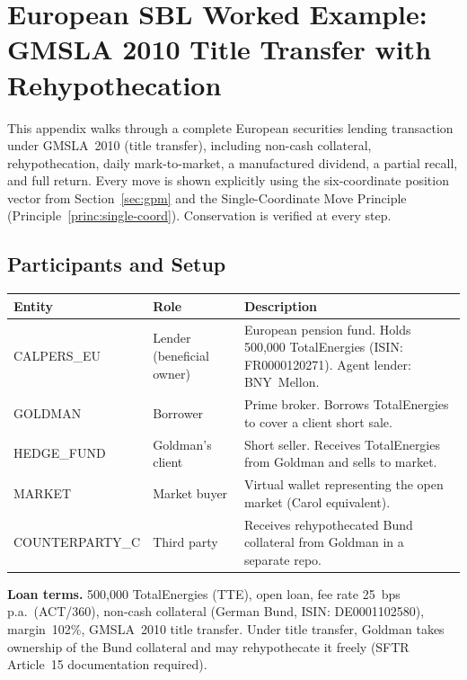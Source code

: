 \documentclass[11pt,a4paper]{article}
\begin{document}
\clearpage
\section{European SBL Worked Example: GMSLA 2010 Title Transfer with Rehypothecation}
\label{app:eu-sbl-example}

This appendix walks through a complete European securities lending transaction under GMSLA~2010 (title transfer), including non-cash collateral, rehypothecation, daily mark-to-market, a manufactured dividend, a partial recall, and full return. Every move is shown explicitly using the six-coordinate position vector from Section~\ref{sec:gpm} and the Single-Coordinate Move Principle (Principle~\ref{princ:single-coord}). Conservation is verified at every step.

\subsection{Participants and Setup}

\begin{center}\small
\begin{tabular}{l l p{7.5cm}}
\toprule
\textbf{Entity} & \textbf{Role} & \textbf{Description} \\
\midrule
CALPERS\_EU & Lender (beneficial owner) & European pension fund. Holds 500{,}000 TotalEnergies (ISIN: FR0000120271). Agent lender: BNY~Mellon. \\
GOLDMAN & Borrower & Prime broker. Borrows TotalEnergies to cover a client short sale. \\
HEDGE\_FUND & Goldman's client & Short seller. Receives TotalEnergies from Goldman and sells to market. \\
MARKET & Market buyer & Virtual wallet representing the open market (Carol equivalent). \\
COUNTERPARTY\_C & Third party & Receives rehypothecated Bund collateral from Goldman in a separate repo. \\
\bottomrule
\end{tabular}
\end{center}

\noindent\textbf{Loan terms.} 500{,}000 TotalEnergies (TTE), open loan, fee rate 25~bps p.a.\ (ACT/360), non-cash collateral (German Bund, ISIN: DE0001102580), margin~102\%, GMSLA~2010 title transfer. Under title transfer, Goldman takes ownership of the Bund collateral and may rehypothecate it freely (SFTR Article~15 documentation required).
\end{document}
